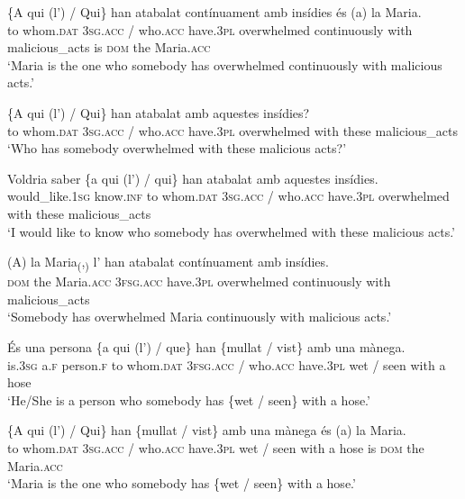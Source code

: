 \documentclass[output=paper,colorlinks,citecolor=brown,modfonts,nonflat]{langsci/langscibook}
\begin{document}
{{ \ex \label{ex:royo:16b}
	\gll \{A qui (l’) / Qui\} han atabalat contínuament amb insídies és (a) la Maria.\\
	 to whom.\textsc{dat} \textsc{3sg.acc} / who.\textsc{acc} have.\textsc{3pl} overwhelmed continuously with malicious\_acts is \textsc{dom} the Maria.\textsc{acc}\\
	\glt ‘Maria is the one who somebody has overwhelmed continuously with malicious acts.’
	
	 
 
 \ex \label{ex:royo:16c}
 \gll \{A qui (l’) / Qui\} han atabalat amb aquestes insídies?\\
to whom.\textsc{dat} \textsc{3sg.acc} / who.\textsc{acc} have.\textsc{3pl} overwhelmed with these malicious\_acts\\
\glt ‘Who has somebody overwhelmed with these malicious acts?’
 
 \ex \label{ex:royo:16d}
 \gll Voldria saber \{a qui (l’) / qui\} han atabalat amb aquestes insídies.\\
 would\_like.\textsc{1sg} know.\textsc{inf}  to whom.\textsc{dat} \textsc{3sg.acc} / who.\textsc{acc} have.\textsc{3pl} overwhelmed with these malicious\_acts\\
\glt ‘I would like to know who somebody has overwhelmed with these malicious acts.’
 
\ex \label{ex:royo:16e}
 \gll (A) la Maria\textsubscript{(},\textsubscript{)}  l’ han atabalat contínuament amb insídies.\\
 \textsc{dom} the Maria.\textsc{acc} \textsc{3fsg.acc} have.\textsc{3pl} overwhelmed continuously with malicious\_acts\\
\glt ‘Somebody has overwhelmed Maria continuously with malicious acts.’
 
 \z
 \z


\ea%
 \label{ex:royo:17}
 \ea \label{ex:royo:17a}
 \gll És una persona \{a qui (l’) / que\} han \{mullat / vist\} amb una mànega.\\
 is.\textsc{3sg} a.\textsc{f} person.\textsc{f} to whom.\textsc{dat} \textsc{3fsg.acc} / who.\textsc{acc} have.\textsc{3pl} wet / seen with a hose\\
\glt ‘He/She is a person who somebody has \{wet / seen\} with a hose.’
 
 \ex \label{ex:royo:17b}
 \gll \{A qui (l’) / Qui\} han \{mullat / vist\} amb una mànega és (a) la Maria.\\
 to whom.\textsc{dat} \textsc{3sg.acc} / who.\textsc{acc} have.\textsc{3pl} wet / seen with a hose is \textsc{dom} the Maria.\textsc{acc}\\
\glt ‘Maria is the one who somebody has \{wet / seen\} with a hose.’
 
}}
\end{document}
